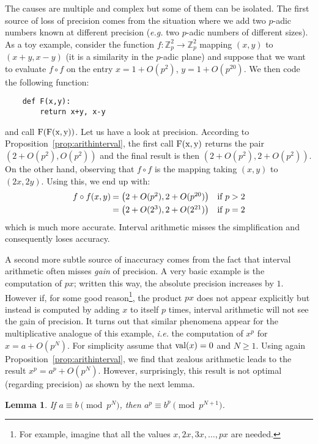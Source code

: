 \documentclass[11pt]{article}
\numberwithin{equation}{section}
\numberwithin{figure}{section}
\renewcommand{\geq}{\geqslant}
\newtheorem{lem}[theo]{Lemma}
\theoremstyle{definition}
\newcommand{\Z}{\mathbb Z}
\newcommand{\Zp}{\Z_p}
\newcommand{\val}{\text{\rm val}}
\newcommand{\ttx}{\texttt{\rm x}\xspace}
\newcommand{\tty}{\texttt{\rm y}\xspace}
\newcommand{\ttF}{\texttt{\rm F}\xspace}
\begin{document}
The causes are multiple and complex but some of them can be isolated. 
The first source of loss of precision comes from the situation where we 
add two $p$-adic numbers known at different precision 
(\emph{e.g.} two $p$-adic numbers of different sizes). As a toy example, 
consider the function $f : \Zp^2 \to \Zp^2$ mapping $(x,y)$ to $(x+y, 
x-y)$ (it is a similarity in the $p$-adic plane) and suppose that we
want to evaluate $f \circ f$ on the entry $x = 1 + O(p^2)$, $y = 1
+ O(p^{20})$. We then code the following function:
\begin{lstlisting}
    def F(x,y):
        return x+y, x-y
\end{lstlisting}
and call $\ttF(\ttF(\ttx,\tty))$.
Let us have a look at precision. According to 
Proposition~\ref{prop:arithinterval}, the first call $\ttF(\ttx,\tty)$ 
returns the pair $(2 + O(p^2), O(p^2))$ and the final result is then 
$(2 + O(p^2), 2 + O(p^2))$. On the other hand, observing that $f \circ f$
is the mapping taking $(x,y)$ to $(2x,2y)$. Using this, we end up with:
$$\begin{array}{r@{\hspace{0.5ex}}ll}
f \circ f(x,y) & = \big(2 + O(p^2), 2 + O(p^{20})\big) 
  & \text{if } p > 2 \smallskip \\
& = \big(2 + O(2^3), 2 + O(2^{21})\big) 
  & \text{if } p = 2
\end{array}$$
which is much more accurate. 
Interval arithmetic misses the simplification and consequently loses 
accuracy.

A second more subtle source of inaccuracy comes from the fact that 
interval arithmetic often misses \emph{gain} of precision. A very basic 
example is the computation of $px$; written this way, the absolute 
precision increases by $1$. However if, for some good 
reason\footnote{For example, imagine that all the values $x, 2x, 3x, 
\ldots, px$ are needed.}, the product $px$ does not appear explicitly 
but instead is computed by adding $x$ to itself $p$ times, 
interval arithmetic will not see the gain of precision.
It turns out that similar phenomena appear for the multiplicative 
analogue of this example, \emph{i.e.} the computation of $x^p$ for $x = 
a + O(p^N)$. For simplicity assume that $\val(x) = 0$ and $N \geq 
1$. Using again Proposition~\ref{prop:arithinterval}, we find that 
zealous arithmetic leads to the result $x^p = a^p + O(p^N)$. However, 
surprisingly, this result is not optimal (regarding precision) as 
shown by the next lemma.

\begin{lem}
\label{lem:ppower}
If $a \equiv b \pmod{p^N}$, then $a^p \equiv b^p \pmod{p^{N+1}}$.
\end{lem}
\end{document}
